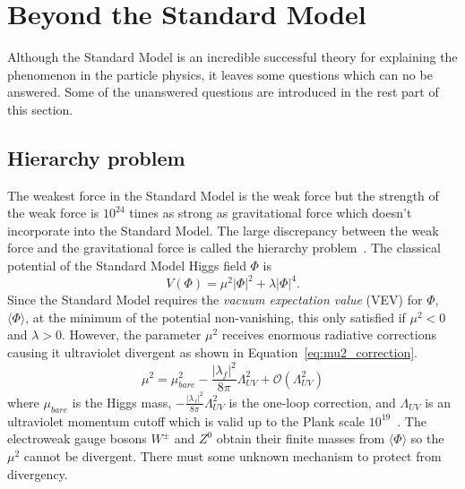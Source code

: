 
\section{Beyond the Standard Model}
\label{sec:sm_bsm}
Although the Standard Model is an incredible successful theory for explaining the phenomenon in the particle physics, it leaves some questions which can no be answered.
Some of the unanswered questions are introduced in the rest part of this section.


\subsection{Hierarchy problem}
\label{subsec:sm_hierarchy_problem}
The weakest force in the Standard Model is the weak force but the strength of the weak force is $10^{24}$ times as strong as gravitational force which doesn't incorporate into the Standard Model.
The large discrepancy between the weak force and the gravitational force is called the hierarchy problem~\cite{Martin:1997ns,PhysLettB.452.28,maarten_brak}.
The classical potential of the Standard Model Higgs field $\Phi$ is
%
\begin{equation}
V(\Phi) = \mu^{2} |\Phi|^2 + \lambda |\Phi|^4.
\end{equation}
%
Since the Standard Model requires the \textit{vacuum expectation value} (VEV) for $\Phi$, $\langle \Phi \rangle$, at the minimum of the potential non-vanishing, this only satisfied if $\mu^{2} < 0$ and $\lambda > 0$.
However, the parameter $\mu^{2}$ receives enormous radiative corrections causing it ultraviolet divergent as shown in Equation~\ref{eq:mu2_correction}.
%
\begin{equation}
\mu^{2} = \mu_{bare}^{2} - \frac{|\lambda_{f}|^{2}}{8\pi}\Lambda_{UV}^{2} + \mathcal{O}(\Lambda_{UV}^{2})
\label{eq:mu2_correction}
\end{equation}
%
where $\mu_{bare}$ is the Higgs mass, $- \frac{|\lambda_{f}|^{2}}{8\pi}\Lambda_{UV}^{2}$ is the one-loop correction, and $\Lambda_{UV}$ is an ultraviolet momentum cutoff which is valid up to the Plank scale $10^{19}$~{\GeV}.
The electroweak gauge bosons $W^{\pm}$ and $Z^{0}$ obtain their finite masses from $\langle \Phi \rangle$ so the $\mu^{2}$ cannot be divergent.
There must some unknown mechanism to protect from divergency.


